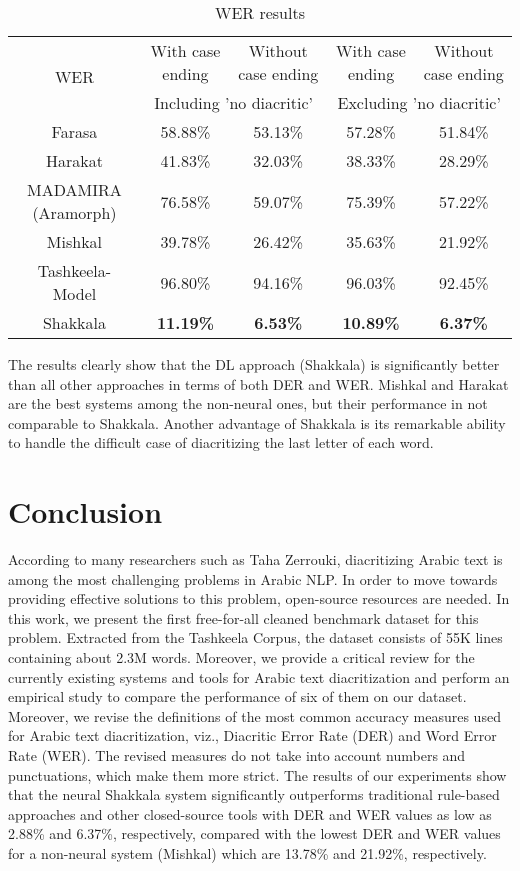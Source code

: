 \documentclass[conference]{IEEEtran}
\begin{document}
\begin{table*}
\centering
\caption{WER results}
\label{tab:wer}
\begin{tabular}{|c|c|c|c|c|}
\hline
\multirow{2}{*}{WER} & With case ending & Without case ending & With case ending & Without case ending \\ \cline{2-5} 
 & \multicolumn{2}{c|}{Including 'no diacritic'} & \multicolumn{2}{c|}{Excluding 'no diacritic'} \\ \hline
Farasa & 58.88\% & 53.13\% & 57.28\% & 51.84\% \\ \hline
Harakat & 41.83\% & 32.03\% & 38.33\% & 28.29\% \\ \hline
MADAMIRA (Aramorph) & 76.58\% & 59.07\% & 75.39\% & 57.22\% \\ \hline
Mishkal & 39.78\% & 26.42\% & 35.63\% & 21.92\% \\ \hline
Tashkeela-Model & 96.80\% & 94.16\% & 96.03\% & 92.45\% \\ \hline
Shakkala & \textbf{11.19\%} & \textbf{6.53\%} & \textbf{10.89\%} & \textbf{6.37\%} \\ \hline
\end{tabular}
\end{table*}



The results clearly show that the DL approach (Shakkala) is significantly better than all other approaches in terms of both DER and WER. Mishkal and Harakat are the best systems among the non-neural ones, but their performance in not comparable to Shakkala. Another advantage of Shakkala is its remarkable ability to handle the difficult case of diacritizing the last letter of each word.


\section{Conclusion}
\label{sec:conc}

According to many researchers such as Taha Zerrouki, diacritizing Arabic text is among the most challenging problems in Arabic NLP. In order to move towards providing effective solutions to this problem, open-source resources are needed. In this work, we present the first free-for-all cleaned benchmark dataset for this problem. Extracted from the Tashkeela Corpus, the dataset consists of 55K lines containing about 2.3M words. Moreover, we provide a critical review for the currently existing systems and tools for Arabic text diacritization and perform an empirical study to compare the performance of six of them on our dataset. Moreover, we revise the definitions of the most common accuracy measures used for Arabic text diacritization, viz., Diacritic Error Rate (DER) and Word Error Rate (WER). The revised measures do not take into account numbers and punctuations, which make them more strict. The results of our experiments show that the neural Shakkala system significantly outperforms traditional rule-based approaches and other closed-source tools with DER and WER values as low as 2.88\% and 6.37\%, respectively, compared with the lowest DER and WER values for a non-neural system (Mishkal) which are 13.78\% and 21.92\%, respectively.



\balance
\end{document}
